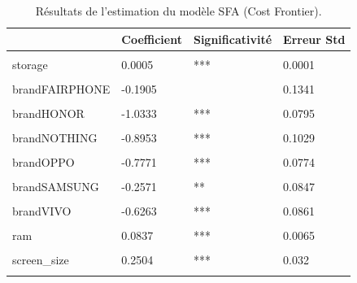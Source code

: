 \documentclass[
  12pt,
]{report}
\begin{document}
\begin{table}[!h]

\caption{\label{tab:scf_results}Résultats de l'estimation du modèle SFA (Cost Frontier).}
\centering
\begin{tabular}[t]{llll}
\toprule
\textbf{ } & \textbf{Coefficient} & \textbf{Significativité} & \textbf{Erreur Std}\\
\midrule
\cellcolor{gray!6}{(Intercept)} & \cellcolor{gray!6}{4.116} & \cellcolor{gray!6}{***} & \cellcolor{gray!6}{0.2456}\\
storage & 0.0005 & *** & 0.0001\\
\cellcolor{gray!6}{brandASUS} & \cellcolor{gray!6}{-0.3969} & \cellcolor{gray!6}{***} & \cellcolor{gray!6}{0.1093}\\
brandFAIRPHONE & -0.1905 &  & 0.1341\\
\cellcolor{gray!6}{brandGOOGLE} & \cellcolor{gray!6}{-0.5307} & \cellcolor{gray!6}{***} & \cellcolor{gray!6}{0.0883}\\
\addlinespace
brandHONOR & -1.0333 & *** & 0.0795\\
\cellcolor{gray!6}{brandMOTOROLA} & \cellcolor{gray!6}{-0.8242} & \cellcolor{gray!6}{***} & \cellcolor{gray!6}{0.0754}\\
brandNOTHING & -0.8953 & *** & 0.1029\\
\cellcolor{gray!6}{brandONEPLUS} & \cellcolor{gray!6}{-0.6939} & \cellcolor{gray!6}{***} & \cellcolor{gray!6}{0.104}\\
brandOPPO & -0.7771 & *** & 0.0774\\
\addlinespace
\cellcolor{gray!6}{brandREALME} & \cellcolor{gray!6}{-0.6867} & \cellcolor{gray!6}{***} & \cellcolor{gray!6}{0.0777}\\
brandSAMSUNG & -0.2571 & ** & 0.0847\\
\cellcolor{gray!6}{brandSONY} & \cellcolor{gray!6}{-0.4151} & \cellcolor{gray!6}{***} & \cellcolor{gray!6}{0.1127}\\
brandVIVO & -0.6263 & *** & 0.0861\\
\cellcolor{gray!6}{brandXIAOMI} & \cellcolor{gray!6}{-0.7933} & \cellcolor{gray!6}{***} & \cellcolor{gray!6}{0.0559}\\
\addlinespace
ram & 0.0837 & *** & 0.0065\\
\cellcolor{gray!6}{inductionTRUE} & \cellcolor{gray!6}{0.289} & \cellcolor{gray!6}{***} & \cellcolor{gray!6}{0.0361}\\
screen\_size & 0.2504 & *** & 0.032\\
\cellcolor{gray!6}{made\_inInde} & \cellcolor{gray!6}{-0.1278} & \cellcolor{gray!6}{} & \cellcolor{gray!6}{0.2268}\\

\end{tabular}
\end{table}
\end{document}
